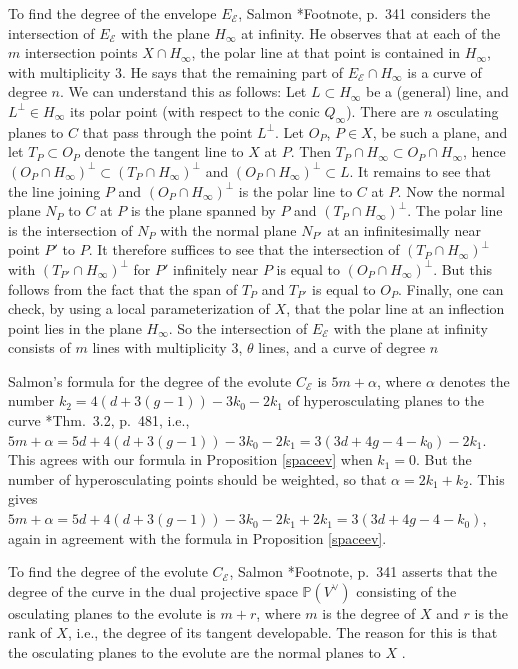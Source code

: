 \documentclass[reqno]{amsart}
\theoremstyle{definition}
\theoremstyle{remark}
\begin{document}
To find the degree of the envelope $E_\mathcal E$, Salmon \cite{Salmon}*{Footnote, p.~341} considers the intersection of $E_\mathcal E$ with the plane $H_\infty$ at infinity. He observes that at each of the $m$ intersection points $X\cap H_\infty$, the polar line at that point is contained in $H_\infty$, with multiplicity $3$. He says that the remaining part of $E_\mathcal E\cap H_\infty$ is a curve of degree $n$. We can understand this as follows: Let $L\subset H_\infty$ be a (general) line, and $L^\perp\in H_\infty$ its polar point (with respect to the conic $Q_\infty$). There are $n$ osculating planes to $C$ that pass through the point $L^\perp$. Let $O_P$, $P\in X$, be such a plane, and let $T_P\subset O_P$ denote the tangent line to $X$ at $P$. Then $T_P\cap H_\infty \subset O_P\cap H_\infty$, hence $(O_P\cap H_\infty)^\perp\subset (T_P\cap H_\infty)^\perp$ and $(O_P\cap H_\infty)^\perp \subset L$. It remains to see that the line joining $P$ and $(O_P\cap H_\infty)^\perp$ is the polar line to $C$ at $P$. Now the normal plane $N_P$ to $C$ at $P$ is the plane spanned by $P$ and $(T_P\cap H_\infty)^\perp$. The polar line is the intersection of $N_P$ with the normal plane $N_{P'}$ at an infinitesimally near point $P'$ to $P$. It therefore suffices to see that the intersection of $(T_P\cap H_\infty)^\perp$ with $(T_{P'}\cap H_\infty)^\perp$ for $P'$ infinitely near $P$ is equal to $(O_P\cap H_\infty)^\perp$. But this follows from the fact that the span of $T_P$ and $T_{P'}$ is equal to $O_P$.
Finally, one can check, by using a local parameterization of $X$, that the polar line at an inflection point lies in the plane $H_\infty$. So the intersection of $E_\mathcal E$ with the plane at infinity consists of $m$ lines with multiplicity $3$, $\theta$ lines, and a curve of degree $n$

Salmon's formula for the degree of the evolute $C_\mathcal E$ is $5m+\alpha$, where $\alpha$ denotes the number $k_2=4(d+3(g-1))-3k_0-2k_1$ of hyperosculating planes to the curve \cite{numchar}*{Thm.~3.2, p.~481}, i.e., $5m+\alpha=5d+4(d+3(g-1))-3k_0-2k_1=3(3d+4g-4-k_0)-2k_1$. This agrees with our formula in Proposition \ref{spaceev} when $k_1=0$. But the number of hyperosculating points should be weighted, so that $\alpha =2k_1+k_2$. This gives $5m+\alpha=5d+4(d+3(g-1))-3k_0-2k_1+2k_1=3(3d+4g-4-k_0)$, again in agreement with the formula in Proposition \ref{spaceev}.

To find the degree of the evolute $C_\mathcal E$, Salmon \cite{Salmon}*{Footnote, p.~341} asserts that the degree of the curve in the dual projective space $\mathbb P(V^\vee)$ consisting  of the osculating planes to the evolute is $m+r$, where $m$ is the degree of $X$ and $r$ is the rank of $X$, i.e., the degree of its tangent developable. The reason for this is that the osculating planes to the evolute are the normal planes to $X$ \cite{BL}.
\end{document}
